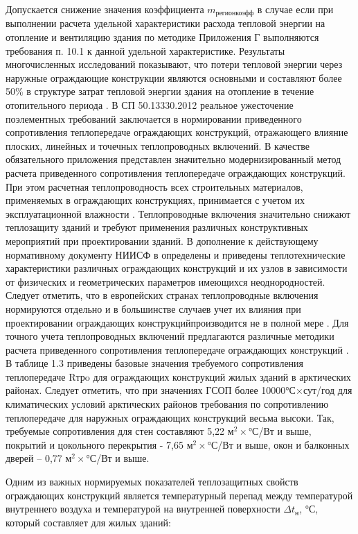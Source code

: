 Допускается снижение значения коэффициента $m_\text{регионкоэфф}$ в случае если при выполнении расчета удельной характеристики расхода тепловой энергии на отопление и
вентиляцию здания по методике Приложения Г \Code{[5]} выполняются требования п. 10.1 \Code{[5]} к данной удельной характеристике. 
Результаты многочисленных исследований показывают, что потери тепловой энергии через наружные ограждающие конструкции являются основными и составляют более 50\%
в структуре затрат тепловой энергии здания на отопление в течение отопительного периода \Code{[22, 23]}.
В СП 50.13330.2012 \cite{law_RU_Rules_Code_ThermalPerformance} реальное ужесточение поэлементных требований заключается в нормировании приведенного сопротивления теплопередаче ограждающих конструкций,
отражающего влияние плоских, линейных и точечных теплопроводных включений. В качестве обязательного приложения представлен значительно модернизированный метод расчета приведенного сопротивления теплопередаче ограждающих конструкций.
При этом расчетная теплопроводность всех строительных материалов, применяемых в ограждающих конструкциях, принимается с учетом их эксплуатационной влажности \Code{[24]}.
Теплопроводные включения значительно снижают теплозащиту зданий и требуют применения различных конструктивных мероприятий при проектировании зданий.
В дополнение к действующему нормативному документу НИИСФ в \Code{[25]} определены и приведены теплотехнические характеристики различных ограждающих конструкций и
их узлов в зависимости от физических и геометрических параметров имеющихся неоднородностей.
Следует отметить, что в европейских странах теплопроводные включения нормируются отдельно и в большинстве случаев учет их
влияния при проектировании ограждающих конструкцийпроизводится не в полной мере \Code{[26]}.
Для точного учета теплопроводных включений предлагаются различные методики расчета приведенного сопротивления теплопередаче ограждающих конструкций \Code{[27, 28]}.
В таблице 1.3 приведены базовые значения требуемого сопротивления теплопередаче Rтрo для ограждающих конструкций жилых зданий в арктических районах.
Следует отметить, что при значениях ГСОП более 10000°С$\times$сут\slash год для климатических условий арктических районов требования по сопротивлению теплопередаче для
наружных ограждающих конструкций весьма высоки. Так, требуемые сопротивления для стен составляют 5,22 м$^2 \times$°С\slash Вт и выше,
покрытий и цокольного перекрытия - 7,65 м$^2 \times$°С\slash Вт и выше, окон и балконных дверей – 0,77 м$^2 \times$°С\slash Вт и выше.

Одним из важных нормируемых показателей теплозащитных свойств ограждающих конструкций является температурный перепад между температурой внутреннего воздуха
и температурой на внутренней поверхности $\Delta t_\text{н}$, °С, который составляет для жилых зданий:

